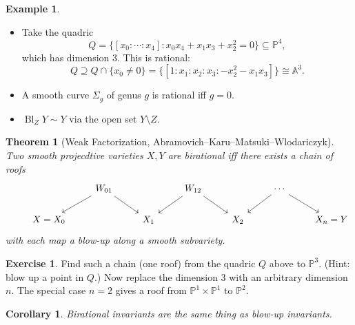 \documentclass{article}
\newtheorem*{theorem}{Theorem}
\newtheorem*{corollary}{Corollary}
\theoremstyle{definition}
\newtheorem*{example}{Example}
\newtheorem*{exercise}{Exercise}
\DeclareMathOperator{\Bl}{Bl}
\renewcommand{\P}{\mathbb{P}}
\newcommand{\A}{\mathbb{A}}
\begin{document}
\begin{example}
    \begin{itemize}
        \item Take the quadric
            \begin{equation*}
                Q = \{[x_0:\cdots:x_4]:x_0x_4+x_1x_3+x_2^2=0\} \subseteq \P^4,
            \end{equation*}
            which has dimension 3. This is rational:
            \begin{equation*}
                Q \supseteq Q\cap\{x_0\ne0\}
                = \{[1:x_1:x_2:x_3:-x_2^2-x_1x_3]\} \cong \A^3.
            \end{equation*}

        \item A smooth curve $\Sigma_g$ of genus $g$ is rational iff $g=0$.

        \item $\Bl_ZY\sim Y$ via the open set $Y\setminus Z$.
    \end{itemize}
\end{example}

\begin{theorem}[Weak Factorization, Abramovich--Karu--Matsuki--Wlodariczyk]
    Two smooth projecdtive varieties $X,Y$ are birational iff there exists a
    chain of roofs
    \begin{equation*}
        \begin{tikzcd}
            & &W_{01} \ar[dl] \ar[dr] & &W_{12} \ar[dl] \ar[dr] &
                &\cdots \ar[dl] \ar[dr] & \\
            &X=X_0 & &X_1 & &X_2 & &X_n=Y
        \end{tikzcd}
    \end{equation*}
    with each map a blow-up along a smooth subvariety.
\end{theorem}

\begin{exercise}
    Find such a chain (one roof) from the quadric $Q$ above to $\P^3$. (Hint:
    blow up a point in $Q$.) Now replace the dimension 3 with an arbitrary
    dimension $n$. The special case $n=2$ gives a roof from $\P^1\times\P^1$ to
    $\P^2$.
\end{exercise}


\begin{corollary}
    Birational invariants are the same thing as blow-up invariants.
\end{corollary}
\end{document}
